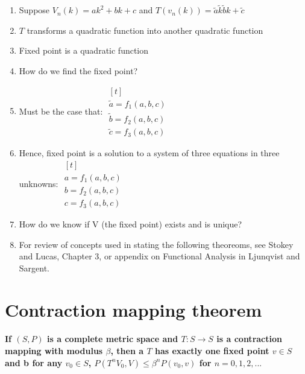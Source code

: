 \documentclass{article}
\begin{document}

\begin{enumerate}
    \item Suppose $V_n(k) = ak^2 + bk + c$ and $T(v_n(k)) = \tilde{a} \tilde{k} \tilde{b}k + \tilde{c}$
    \item $T$ transforms a quadratic function into another quadratic function
    \item Fixed point is a quadratic function
    \item How do we find the fixed point?
    \item Must be the case that: $\begin{aligned}[t] \\ \tilde{a} = f_1(a,b,c) \\
    \tilde{b} = f_2(a,b,c) \\
    \tilde{c} = f_3(a, b, c)
    \end{aligned}$
    \item Hence, fixed point is a solution to a system of three equations in three unknowns: $\begin{aligned}[t] \\
    a = f_1(a,b,c) \\
    b = f_2(a,b,c) \\
    c = f_3(a,b,c)
    \end{aligned}$
    \item How do we know if V (the fixed point) exists and is unique?
    \item For review of concepts used in stating the following theoreoms, see Stokey and Lucas, Chapter 3, or
    appendix on Functional Analysis in Ljunqvist and Sargent.
\end{enumerate}

\section{Contraction mapping theorem}

\paragraph{If $(S,P)$ is a complete metric space and 
$T:S \rightarrow S$ is a 
contraction mapping with modulus $\beta$, then a $T$ has exactly one fixed point $v \in S$ 
and b for any $v_0 \in S$, $P(T^nV_0,V) \leq \beta^n P(v_0,v)$ for $n = 0,1,2,...$}
\end{document}
